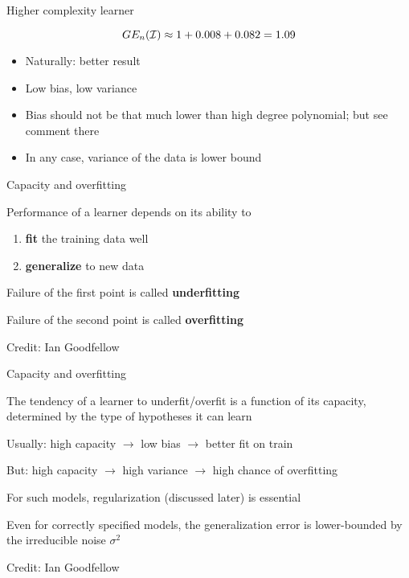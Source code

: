 \documentclass[11pt,compress,t,notes=noshow, xcolor=table]{beamer}
\begin{document}
\begin{frame}{Higher complexity learner}

  \splitVThree
  {}
  {}
  {}

\vfill

$$GE_n(\mathcal{I}) \approx 1 + 0.008 + 0.082 = 1.09 $$

\begin{itemize}
  \item Naturally: better result
  \item Low bias, low variance
  \item Bias should not be that much lower than
  high degree polynomial; but see comment there
  \item In any case, variance of the data is lower bound
\end{itemize}

\end{frame}

\begin{framei}[sep=L]{Capacity and overfitting}

  \item Performance of a learner depends on its ability to 
    \begin{enumerate}
      \item \textbf{fit} the training data well
      \item \textbf{generalize} to new data
    \end{enumerate}  
  \item Failure of the first point is called \textbf{underfitting}
  \item Failure of the second point is called \textbf{overfitting}
  
  \tiny \centering
  Credit: Ian Goodfellow

\end{framei}

\begin{framei}[sep=M]{Capacity and overfitting}

  \item The tendency of a learner to underfit/overfit is a function of its capacity, determined by the type of hypotheses it can learn
  \item Usually: high capacity $\rightarrow$ low bias $\rightarrow$ better fit on train
  \item But: high capacity $\rightarrow$ high variance $\rightarrow$ high chance of overfitting
  \item For such models, regularization (discussed later) is essential
  \item Even for correctly specified models, the generalization error is lower-bounded by the irreducible noise $\sigma^2$

  \tiny \centering
  Credit: Ian Goodfellow
  
\end{framei}

\endlecture
\end{document}
